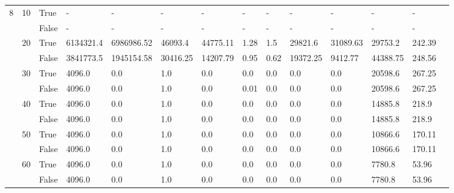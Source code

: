 \begin{landscape}
\begin{small}
\begin{longtable}[c]{@{}lll|ll|ll|ll|ll|lll@{}}
  \midrule
8  & 10 & True  & -               & -              & -             & -             & -             & -             & -             & -             & -             & -           &  \\
   &    & False & -               & -              & -             & -             & -             & -             & -             & -             & -             & -           &  \\
   & 20 & True  & 6134321.4       & 6986986.52     & 46093.4       & 44775.11      & 1.28          & 1.5           & 29821.6       & 31089.63      & 29753.2       & 242.39      &  \\
   &    & False & 3841773.5       & 1945154.58     & 30416.25      & 14207.79      & 0.95          & 0.62          & 19372.25      & 9412.77       & 44388.75      & 248.56      &  \\
   & 30 & True  & 4096.0          & 0.0            & 1.0           & 0.0           & 0.0           & 0.0           & 0.0           & 0.0           & 20598.6       & 267.25      &  \\
   &    & False & 4096.0          & 0.0            & 1.0           & 0.0           & 0.01          & 0.0           & 0.0           & 0.0           & 20598.6       & 267.25      &  \\
   & 40 & True  & 4096.0          & 0.0            & 1.0           & 0.0           & 0.0           & 0.0           & 0.0           & 0.0           & 14885.8       & 218.9       &  \\
   &    & False & 4096.0          & 0.0            & 1.0           & 0.0           & 0.0           & 0.0           & 0.0           & 0.0           & 14885.8       & 218.9       &  \\
   & 50 & True  & 4096.0          & 0.0            & 1.0           & 0.0           & 0.0           & 0.0           & 0.0           & 0.0           & 10866.6       & 170.11      &  \\
   &    & False & 4096.0          & 0.0            & 1.0           & 0.0           & 0.0           & 0.0           & 0.0           & 0.0           & 10866.6       & 170.11      &  \\
   & 60 & True  & 4096.0          & 0.0            & 1.0           & 0.0           & 0.0           & 0.0           & 0.0           & 0.0           & 7780.8        & 53.96       &  \\
   &    & False & 4096.0          & 0.0            & 1.0           & 0.0           & 0.0           & 0.0           & 0.0           & 0.0           & 7780.8        & 53.96       &  \\

\end{longtable}
\end{small}
\end{landscape}
